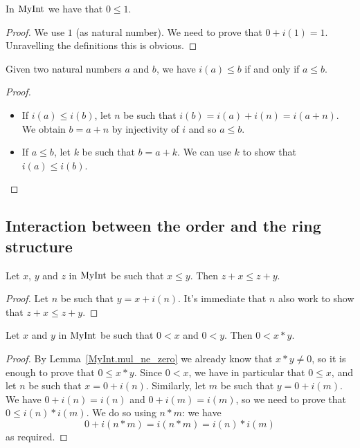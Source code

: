 \begin{lemma}
    \label{MyInt.zero_le_one}
    \leanok
    In $\mathrm{MyInt}$ we have that $0 \leq 1$.
\end{lemma}
\begin{proof}
    \leanok
    We use $1$ (as natural number). We need to prove that $0 + i(1) = 1$. Unravelling the definitions
    this is obvious.
\end{proof}

\begin{lemma}
    \label{MyInt.i_le_iff}
    \leanok
    Given two natural numbers $a$ and $b$, we have $i(a) \leq b$ if and only if $a \leq b$.
\end{lemma}
\begin{proof}
    \leanok
    \begin{itemize}
        \item If $i(a) \leq i(b)$, let $n$ be such that $i(b) = i(a)+i(n)=i(a+n)$. We obtain $b = a + n$ by injectivity of $i$ and so $a \leq b$.
        \item If $a \leq b$, let $k$ be such that $b = a + k$. We can use $k$ to show that $i(a) \leq i(b)$.
    \end{itemize}
\end{proof}

\subsection{Interaction between the order and the ring structure}

\begin{lemma}
    \label{MyInt.add_le_add_left}
    \leanok
    Let $x$, $y$ and $z$ in $\mathrm{MyInt}$ be such that $x \leq y$. Then $z + x ≤ z + y$.
\end{lemma}
\begin{proof}
    \leanok
    Let $n$ be such that $y = x + i(n)$. It's immediate that $n$ also work to show that $z + x ≤ z + y$.
\end{proof}

\begin{lemma}
    \label{MyInt.mul_pos}
    \leanok
    Let $x$ and $y$ in $\mathrm{MyInt}$ be such that $0 < x$ and $0 < y$. Then $0 < x * y$.
\end{lemma}
\begin{proof}
    \leanok
    By Lemma~\ref{MyInt.mul_ne_zero} we already know that $x*y \neq 0$, so it is enough to prove that
    $0 \leq x*y$. Since $0 < x$, we have in particular that $0 \leq x$, and let $n$ be such that $x = 0 + i(n)$. Similarly, let $m$ be such that $y = 0 + i(m)$. We have $0 + i(n) = i(n)$ and $0 + i(m) = i(m)$, so we need to prove that $0 \leq i(n)*i(m)$. We do so using $n*m$: we have
    \[
    0+i(n*m)=i(n*m)=i(n)*i(m)
    \]
    as required.
\end{proof}